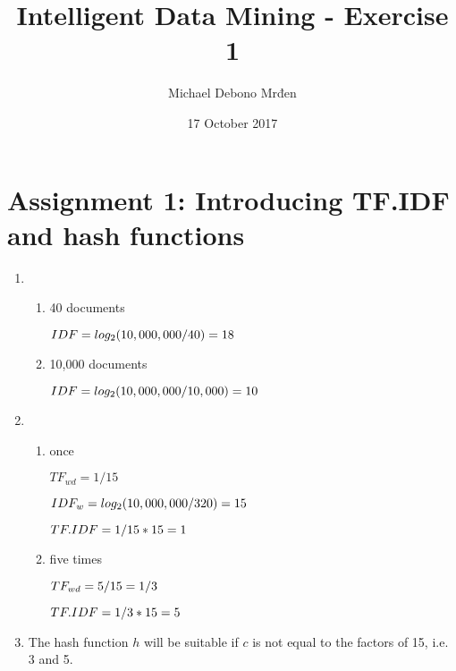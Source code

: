 \documentclass{article}
\title{Intelligent Data Mining - Exercise 1}
\author{Michael Debono Mrđen}
\date{17 October 2017}
\begin{document}
\maketitle

\section{Assignment 1: Introducing TF.IDF and hash functions}
\renewcommand{\labelenumi}{\alph{enumi}.}
\renewcommand{\labelenumii}{(\alph{enumii})}
\begin{enumerate}
\item
\begin{enumerate}
\item{40 documents

$IDF \\ = log_2(10,000,000/40) \\ = 18$}

\item{10,000 documents

$IDF \\ = log_2(10,000,000/10,000) \\ = 10$}
\end{enumerate}
\item
\begin{enumerate}
\item{once

$TF_{wd} = 1/15$

$IDF_w = log_2(10,000,000/320) \\ = 15$

$TF.IDF = 1/15 * 15 \\ = 1$}

\item{five times

$TF_{wd} = 5/15 \\ = 1/3$

$TF.IDF = 1/3 * 15 \\ = 5$}
\end{enumerate}
\item{The hash function $h$ will be suitable if $c$ is not equal to the factors of 15, i.e. 3 and 5.}
\end{enumerate}
\end{document}
